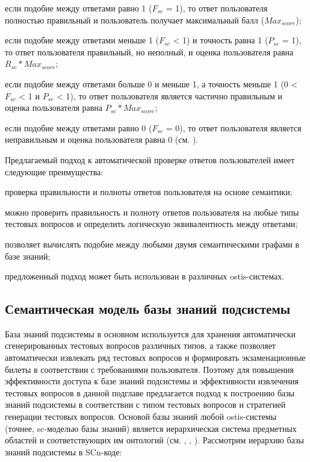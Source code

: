 \begin{textitemize}
	\item если подобие между ответами равно 1 ($F_{sc}$ = 1), то ответ пользователя полностью правильный и пользователь получает максимальный балл ($Max_{score}$);
	
	\item если подобие между ответами меньше 1 ($F_{sc}$ < 1) и точность равна 1 ($P_{sc}$ = 1), то ответ пользователя правильный, но неполный, и оценка пользователя равна $R_{sc}*Max_{score}$;
	
	\item если подобие между ответами больше 0 и меньше 1, а точность меньше 1 (0 < $F_{sc}$ < 1 и $P_{sc}$ < 1), то ответ пользователя является частично правильным и оценка пользователя равна $P_{sc}*Max_{score}$;
	
	\item если подобие между ответами равно 0 ($F_{sc}$ = 0), то ответ пользователя является неправильным и оценка пользователя равна 0 (см. ).
\end{textitemize}

Предлагаемый подход к автоматической проверке ответов пользователей имеет следующие преимущества:

\begin{textitemize}
	\item проверка правильности и полноты ответов пользователя на основе семантики;
	
	\item можно проверить правильность и полноту ответов пользователя на любые типы тестовых вопросов и определить логическую эквивалентность между ответами;
	
	\item позволяет вычислять подобие между любыми двумя семантическими графами в базе знаний;
	
	\item предложенный подход может быть использован в различных ostis-системах.
\end{textitemize}

\subsection{Семантическая модель базы знаний подсистемы}

База знаний подсистемы в основном используется для хранения автоматически сгенерированных тестовых вопросов различных типов, а также позволяет автоматически извлекать ряд тестовых вопросов и формировать экзаменационные билеты в соответствии с требованиями пользователя. Поэтому для повышения эффективности доступа к базе знаний подсистемы и эффективности извлечения тестовых вопросов в данной подглаве предлагается подход к построению базы знаний подсистемы в соответствии с типом тестовых вопросов и стратегией генерации тестовых вопросов. Основой базы знаний любой ostis-системы (точнее, sc-моделью базы знаний) является иерархическая система предметных областей и соответствующих им онтологий (см. , , ). Рассмотрим иерархию базы знаний подсистемы в SCn-коде:

